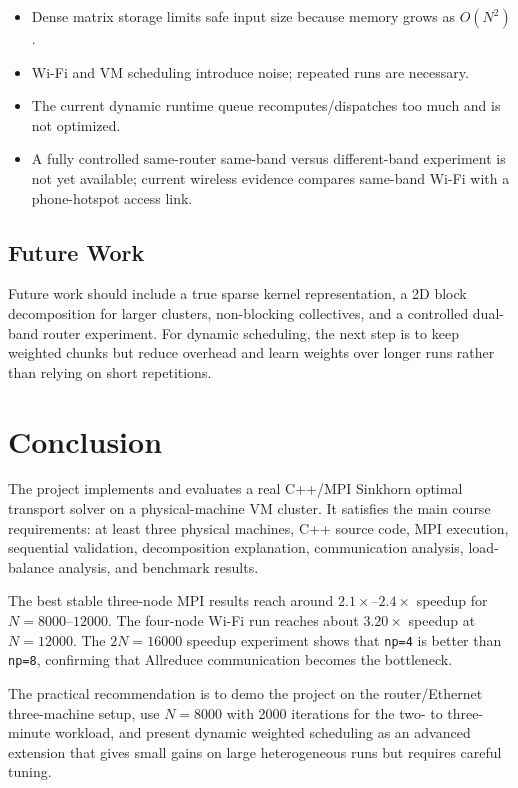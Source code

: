 \documentclass[12pt,a4paper]{article}
\begin{document}
\begin{itemize}
  \item Dense matrix storage limits safe input size because memory grows as $O(N^2)$.
  \item Wi-Fi and VM scheduling introduce noise; repeated runs are necessary.
  \item The current dynamic runtime queue recomputes/dispatches too much and is not optimized.
  \item A fully controlled same-router same-band versus different-band experiment is not yet available; current wireless evidence compares same-band Wi-Fi with a phone-hotspot access link.
\end{itemize}

\subsection{Future Work}

Future work should include a true sparse kernel representation, a 2D block decomposition for larger clusters, non-blocking collectives, and a controlled dual-band router experiment. For dynamic scheduling, the next step is to keep weighted chunks but reduce overhead and learn weights over longer runs rather than relying on short repetitions.

\section{Conclusion}

The project implements and evaluates a real C++/MPI Sinkhorn optimal transport solver on a physical-machine VM cluster. It satisfies the main course requirements: at least three physical machines, C++ source code, MPI execution, sequential validation, decomposition explanation, communication analysis, load-balance analysis, and benchmark results.

The best stable three-node MPI results reach around $2.1\times$--$2.4\times$ speedup for $N=8000$--$12000$. The four-node Wi-Fi run reaches about $3.20\times$ speedup at $N=12000$. The $2N=16000$ speedup experiment shows that \texttt{np=4} is better than \texttt{np=8}, confirming that Allreduce communication becomes the bottleneck.

The practical recommendation is to demo the project on the router/Ethernet three-machine setup, use $N=8000$ with 2000 iterations for the two- to three-minute workload, and present dynamic weighted scheduling as an advanced extension that gives small gains on large heterogeneous runs but requires careful tuning.
\end{document}
